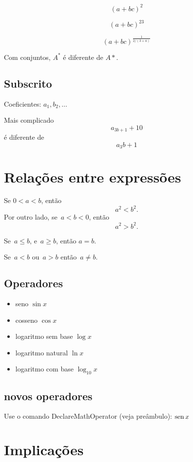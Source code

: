 \[
(a+bc)^2
\]

\[
(a+bc)^{23}
\]

\[
(a+bc)^{\frac{1}{2/(3+a)}}
\]

Com conjuntos, \(A^*\) 
é diferente de \(A*\).

\section{Subscrito}

Coeficientes: \(a_1, b_2, \ldots\)

Mais complicado
\[
a_{3b + 1} + 10
\]
é diferente de 
\[
a_3b + 1
\]

\chapter{Relações entre expressões}

Se \(0 < a < b\), então
\[
a^2 < b^2.
\]
Por outro lado, se~\(a < b < 0\), então
\[
a^2 > b^2.
\]

Se~\(a \leq b\),
e~\(a \geq b\),
então
\(a=b\).

Se~\(a<b\) ou~\(a>b\) então~\(a \neq b\).

\clearpage
\section{Operadores}

\begin{itemize}
\item seno \(\sin x\)
\item cosseno \(\cos x\)
\item logaritmo sem base \(\log x\)
\item logaritmo natural \(\ln x\)
\item logaritmo com base \( \log_{10} x\)
\end{itemize}

\section{novos operadores}

Use o comando DeclareMathOperator 
(veja preâmbulo): \(\operatorname{sen} x\)

\chapter{Implicações}

